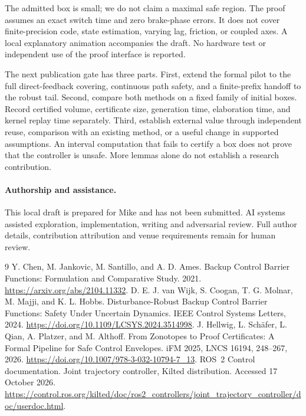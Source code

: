 \documentclass[10pt]{article}
\begin{document}
The admitted box is small; we do not claim a maximal safe region. The proof assumes an exact switch time and zero brake-phase errors. It does not cover finite-precision code, state estimation, varying lag, friction, or coupled axes. A local explanatory animation accompanies the draft. No hardware test or independent use of the proof interface is reported.

The next publication gate has three parts. First, extend the formal pilot to the full direct-feedback covering, continuous path safety, and a finite-prefix handoff to the robust tail. Second, compare both methods on a fixed family of initial boxes. Record certified volume, certificate size, generation time, elaboration time, and kernel replay time separately. Third, establish external value through independent reuse, comparison with an existing method, or a useful change in supported assumptions. An interval computation that fails to certify a box does not prove that the controller is unsafe. More lemmas alone do not establish a research contribution.

\paragraph{Authorship and assistance.}
This local draft is prepared for Mike and has not been submitted. AI systems assisted exploration, implementation, writing and adversarial review. Full author details, contribution attribution and venue requirements remain for human review.

\begin{thebibliography}{9}\small
{} Y. Chen, M. Jankovic, M. Santillo, and A. D. Ames.
Backup Control Barrier Functions: Formulation and Comparative Study. 2021.
\url{https://arxiv.org/abs/2104.11332}.
 D. E. J. van Wijk, S. Coogan, T. G. Molnar, M. Majji, and K. L. Hobbs.
Disturbance-Robust Backup Control Barrier Functions: Safety Under Uncertain Dynamics.
IEEE Control Systems Letters, 2024.
\url{https://doi.org/10.1109/LCSYS.2024.3514998}.
 J. Hellwig, L. Sch\"afer, L. Qian, A. Platzer, and M. Althoff.
From Zonotopes to Proof Certificates: A Formal Pipeline for Safe Control Envelopes.
iFM 2025, LNCS 16194, 248--267, 2026.
\url{https://doi.org/10.1007/978-3-032-10794-7_13}.
 ROS~2 Control documentation.
Joint trajectory controller, Kilted distribution. Accessed 17 October 2026.
\url{https://control.ros.org/kilted/doc/ros2_controllers/joint_trajectory_controller/doc/userdoc.html}.
\end{thebibliography}
\end{document}
